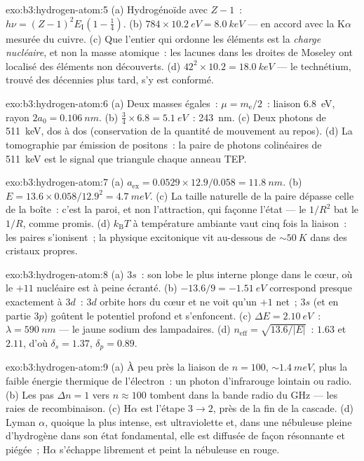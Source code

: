 \begin{solution}{exo:b3:hydrogen-atom:5}
(a) Hydrogénoïde avec $Z - 1$~: $h\nu = (Z-1)^2E_{\text{I}}(1 -
\tfrac14)$. (b) $784 \times \qty{10.2}{eV} = \qty{8.0}{keV}$ ---
en accord avec la K$\alpha$ mesurée du cuivre. (c) Que l'entier qui
ordonne les éléments est la \emph{charge nucléaire}, et non la masse
atomique~: les lacunes dans les droites de Moseley ont localisé des
éléments non découverts. (d) $42^2 \times 10.2 = \qty{18.0}{keV}$ ---
le technétium, trouvé des décennies plus tard, s'y est conformé.
\end{solution}

\begin{solution}{exo:b3:hydrogen-atom:6}
(a) Deux masses égales~: $\mu = m_{\text{e}}/2$~: liaison
\qty{6.8}{eV}, rayon $2a_0 = \qty{0.106}{nm}$. (b) $\tfrac34
\times 6.8 = \qty{5.1}{eV}$~: \qty{243}{nm}. (c) Deux photons de
\qty{511}{keV}, dos à dos (conservation de la quantité de mouvement
au repos). (d) La tomographie par émission de positons~: la paire de
photons colinéaires de \qty{511}{keV} est le signal que triangule
chaque anneau TEP.
\end{solution}

\begin{solution}{exo:b3:hydrogen-atom:7}
(a) $a_{\text{ex}} = 0.0529 \times 12.9/0.058 = \qty{11.8}{nm}$.
(b) $E = 13.6 \times 0.058/12.9^2 = \qty{4.7}{meV}$. (c) La taille
naturelle de la paire dépasse celle de la boîte~: c'est la paroi, et
non l'attraction, qui façonne l'état --- le $1/R^2$ bat le $1/R$,
comme promis. (d) $k_{\text{B}}T$ à température ambiante vaut cinq
fois la liaison~: les paires s'ionisent~; la physique excitonique vit
au-dessous de $\sim\qty{50}{K}$ dans des cristaux propres.
\end{solution}

\begin{solution}{exo:b3:hydrogen-atom:8}
(a) $3s$~: son lobe le plus interne plonge dans le cœur, où le $+11$
nucléaire est à peine écranté. (b) $-13.6/9 = \qty{-1.51}{eV}$
correspond presque exactement à $3d$~: $3d$ orbite hors du cœur et ne
voit qu'un $+1$ net~; $3s$ (et en partie $3p$) goûtent le potentiel
profond et s'enfoncent. (c) $\Delta E = \qty{2.10}{eV}$~:
$\lambda = \qty{590}{nm}$ --- le jaune sodium des lampadaires. (d) $n_{\text{eff}} =
\sqrt{13.6/|E|}$~: $1.63$ et $2.11$, d'où $\delta_s = 1.37$,
$\delta_p = 0.89$.
\end{solution}

\begin{solution}{exo:b3:hydrogen-atom:9}
(a) À peu près la liaison de $n = 100$, $\sim\qty{1.4}{meV}$, plus la
faible énergie thermique de l'électron~: un photon d'infrarouge
lointain ou radio. (b) Les pas $\Delta n = 1$ vers $n \approx 100$
tombent dans la bande radio du GHz --- les raies de recombinaison. (c)
H$\alpha$ est l'étape $3 \to
2$, près de la fin de la cascade. (d) Lyman $\alpha$, quoique la plus
intense, est ultraviolette et, dans une nébuleuse pleine d'hydrogène
dans son état fondamental, elle est diffusée de façon résonnante et
piégée~; H$\alpha$ s'échappe librement et peint la nébuleuse en rouge.
\end{solution}

